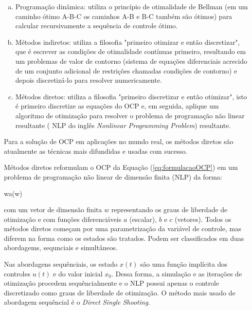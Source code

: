 \begin{enumerate}[(a)]
	\item Programação dinâmica: utiliza o princípio de otimalidade de Bellman (em um caminho ótimo A-B-C os caminhos A-B e B-C também são ótimos) para calcular recursivamente a sequência de controle ótimo. 
	\item Métodos indiretos: utiliza a filosofia "primeiro otimizar e então discretizar", que é escrever as condições de otimalidade contínuas primeiro,
		resultando em um problemas de valor de contorno (sistema de equações diferenciais acrecido de um conjunto adicional de restrições chamadas condições de contorno) e depois discretizá-lo para resolver numericamente.
	\item Métodos diretos: utiliza a filosofia "primeiro discretizar e então otimizar", isto é primeiro discretize as equações do OCP e, em seguida, aplique um algoritmo de otimização para resolver o problema de programação 
	não linear resultante ( NLP do inglês \textit{Nonlinear Programming Problem}) resultante.
\end{enumerate}

Para a solução de OCP em aplicações no mundo real, os métodos diretos são atualmente as técnicas mais difundidas e usadas com sucesso. \cite{article:Diehl,book:betts2010}

Métodos diretos reformulam o OCP da Equação (\ref{eq:formulacaoOCP}) em um problema de programação não linear de dimensão finita (NLP) da forma:

\begin{mini!}
	{w}{a(w) \label{eq: NLP1}}
	{\label{eq: NLP}}{}
\end{mini!}

com um vetor de dimensão finita $w$ representando os graus de liberdade de otimização e com funções diferenciáveis $a$ (escalar), $b$ e $c$ (vetores). 
Todos os métodos diretos começam por uma parametrização da variável de controle, mas diferem na forma como os estados são tratados. Podem ser classificados em duas abordagems, sequnciais e simultâneos. \cite{article:Diehl} 

Nas abordagens sequênciais, os estado $x(t)$ são uma função implícita dos controles $u(t)$ e do valor inicial $x_0$. Dessa forma, a simulação
e as iterações de otimização procedem sequêncialmente e o NLP possui apenas o controle discretizado como graus de liberdade de otimização. O método mais usado de abordagem sequêncial é o \textit{Direct Single Shooting}. \cite{article:Diehl}


